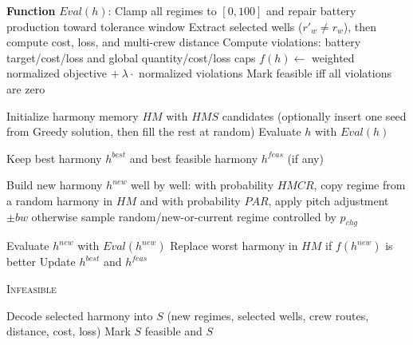 \documentclass[a4paper,11pt]{article}
\begin{document}
\Needspace{8cm}
\begin{algorithm}[H]
\caption{Harmony Search solver for regime adjustment (core loop)}
\label{alg:harmony_search_solver}
\begin{algorithmic}[1]
\Statex
\State \textbf{Function} $Eval(h)$:
\Statex \hspace{1em} Clamp all regimes to $[0,100]$ and repair battery production toward tolerance window
\Statex \hspace{1em} Extract selected wells ($r'_w \neq r_w$), then compute cost, loss, and multi-crew distance
\Statex \hspace{1em} Compute violations: battery target/cost/loss and global quantity/cost/loss caps
\Statex \hspace{1em} $f(h) \gets$ weighted normalized objective $+\ \lambda\cdot$ normalized violations
\Statex \hspace{1em} Mark feasible iff all violations are zero

\State Initialize harmony memory $HM$ with $HMS$ candidates
\Statex \hspace{1em} (optionally insert one seed from Greedy solution, then fill the rest at random)
    \State Evaluate $h$ with $Eval(h)$
\EndFor

\State Keep best harmony $h^{best}$ and best feasible harmony $h^{feas}$ (if any)

    \State Build new harmony $h^{new}$ well by well:
    \Statex \hspace{1em} with probability $HMCR$, copy regime from a random harmony in $HM$
    \Statex \hspace{1em} and with probability $PAR$, apply pitch adjustment $\pm bw$
    \Statex \hspace{1em} otherwise sample random/new-or-current regime controlled by $p_{chg}$

    \State Evaluate $h^{new}$ with $Eval(h^{new})$
    \State Replace worst harmony in $HM$ if $f(h^{new})$ is better
    \State Update $h^{best}$ and $h^{feas}$
\EndFor

    \State \Return \textsc{Infeasible}
\EndIf

\State Decode selected harmony into $S$ (new regimes, selected wells, crew routes, distance, cost, loss)
\State Mark $S$ feasible and \Return $S$

\end{algorithmic}
\end{algorithm}
\end{document}
